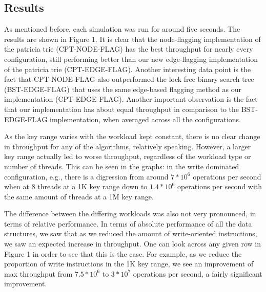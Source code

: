 \documentclass[conference]{IEEEtran}
\begin{document}
\subsection{Results}
As mentioned before, each simulation was run for around five seconds. The results are shown in Figure 1.
It is clear that the node-flagging implementation of the patricia trie (CPT-NODE-FLAG) has the best throughput for nearly every configuration, still performing better than our new edge-flagging implementation of the patricia trie (CPT-EDGE-FLAG). Another interesting data point is the fact that CPT-NODE-FLAG also outperformed the lock free binary search tree (BST-EDGE-FLAG) that uses the same edge-based flagging method as our implementation (CPT-EDGE-FLAG). Another important observation is the fact that our implementation has about equal throughput in comparison to the BST-EDGE-FLAG implementation, when averaged across all the configurations. 
\par
As the key range varies with the workload kept constant, there is no clear change in throughput for any of the algorithms, relatively speaking. However, a larger key range actually led to worse throughput, regardless of the workload type or number of threads. This can be seen in the graphs: in the write dominated configuration, e.g., there is a digression from around $7*10^6$ operations per second when at 8 threads at a 1K key range down to $1.4*10^6$ operations per second with the same amount of threads at a 1M key range.
\par
The difference between the differing workloads was also not very pronounced, in terms of relative performance. In terms of absolute performance of all the data structures, we saw that as we reduced the amount of write-oriented instructions, we saw an expected increase in throughput. One can look across any given row in Figure 1 in order to see that this is the case. For example, as we reduce the proportion of write instructions in the 1K key range, we see an improvement of max throughput from $7.5*10^6$ to $3*10^7$ operations per second, a fairly significant improvement. 
\end{document}
